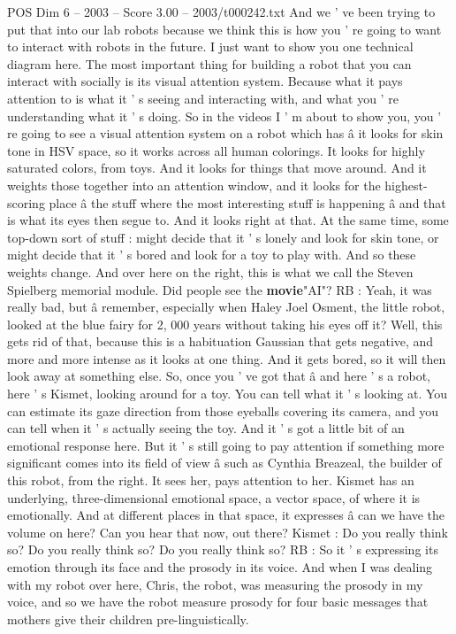 \begin{textsample}{POS Dim 6 – 2003 – Score 3.00 – 2003/t000242.txt}
And we ' ve been trying to put that into our lab robots because we think this is how you ' re going to want to interact with robots in the future.
I just want to show you one technical diagram here.
The most important thing for building a robot that you can interact with socially is its visual attention system.
Because what it pays attention to is what it ' s seeing and interacting with, and what you ' re understanding what it ' s doing.
So in the videos I ' m about to show you, you ' re going to see a visual attention system on a robot which has â it looks for skin tone in HSV space, so it works across all human colorings.
It looks for highly saturated colors, from toys.
And it looks for things that move around.
And it weights those together into an attention window, and it looks for the highest-scoring place â the stuff where the most interesting stuff is happening â and that is what its eyes then segue to.
And it looks right at that.
At the same time, some top-down sort of stuff : might decide that it ' s lonely and look for skin tone, or might decide that it ' s bored and look for a toy to play with.
And so these weights change.
And over here on the right, this is what we call the Steven Spielberg memorial module.
Did people see the \textbf{movie}"AI"?
RB : Yeah, it was really bad, but â remember, especially when Haley Joel Osment, the little robot, looked at the blue fairy for 2, 000 years without taking his eyes off it?
Well, this gets rid of that, because this is a habituation Gaussian that gets negative, and more and more intense as it looks at one thing.
And it gets bored, so it will then look away at something else.
So, once you ' ve got that â and here ' s a robot, here ' s Kismet, looking around for a toy.
You can tell what it ' s looking at.
You can estimate its gaze direction from those eyeballs covering its camera, and you can tell when it ' s actually seeing the toy.
And it ' s got a little bit of an emotional response here.
But it ' s still going to pay attention if something more significant comes into its field of view â such as Cynthia Breazeal, the builder of this robot, from the right.
It sees her, pays attention to her.
Kismet has an underlying, three-dimensional emotional space, a vector space, of where it is emotionally.
And at different places in that space, it expresses â can we have the volume on here?
Can you hear that now, out there?
Kismet : Do you really think so?
Do you really think so?
Do you really think so?
RB : So it ' s expressing its emotion through its face and the prosody in its voice.
And when I was dealing with my robot over here, Chris, the robot, was measuring the prosody in my voice, and so we have the robot measure prosody for four basic messages that mothers give their children pre-linguistically.

\end{textsample}
